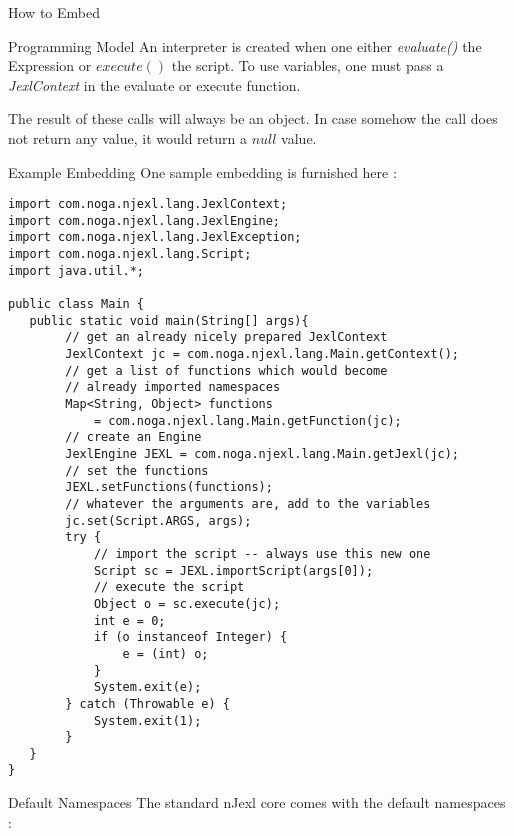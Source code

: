 \begin{section}{How to Embed}
\begin{subsection}{Programming Model}
An interpreter is created when one either \emph{evaluate()} the Expression or $execute()$ the script.
To use variables, one must pass a \emph{JexlContext} in the evaluate or execute function.   

The result of these calls will always be an object. In case somehow the call does not return 
any value, it would return a $null$ value. 

\end{subsection}

\begin{subsection}{Example Embedding}
One sample embedding is furnished here :


\begin{center}\begin{minipage}{\linewidth}
\begin{lstlisting}[style=myJavaStyle]
import com.noga.njexl.lang.JexlContext;
import com.noga.njexl.lang.JexlEngine;
import com.noga.njexl.lang.JexlException;
import com.noga.njexl.lang.Script;
import java.util.*;

public class Main {
   public static void main(String[] args){
        // get an already nicely prepared JexlContext
        JexlContext jc = com.noga.njexl.lang.Main.getContext();
        // get a list of functions which would become 
        // already imported namespaces
        Map<String, Object> functions 
            = com.noga.njexl.lang.Main.getFunction(jc);
        // create an Engine 
        JexlEngine JEXL = com.noga.njexl.lang.Main.getJexl(jc);
        // set the functions 
        JEXL.setFunctions(functions);
        // whatever the arguments are, add to the variables 
        jc.set(Script.ARGS, args);
        try {
            // import the script -- always use this new one 
            Script sc = JEXL.importScript(args[0]);
            // execute the script 
            Object o = sc.execute(jc);
            int e = 0;
            if (o instanceof Integer) {
                e = (int) o;
            }
            System.exit(e);
        } catch (Throwable e) {
            System.exit(1);
        }
   }
}
\end{lstlisting}  
\end{minipage}\end{center}
\end{subsection}

\begin{subsection}{Default Namespaces}
The standard nJexl core comes with the default namespaces :


\end{subsection}
\end{section}
